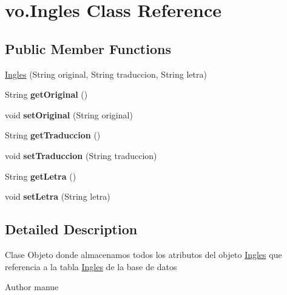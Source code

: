 \hypertarget{classvo_1_1_ingles}{}\section{vo.\+Ingles Class Reference}
\label{classvo_1_1_ingles}
\subsection*{Public Member Functions}
\begin{DoxyCompactItemize}
\item 
\mbox{\hyperlink{classvo_1_1_ingles_a843fd4ed2c71077a7b08723ca778019a}{Ingles}} (String original, String traduccion, String letra)
\item 
\mbox{\label{classvo_1_1_ingles_ac3f680e7f7363688b268a01e4b57d30d}} 
String {\bfseries get\+Original} ()
\item 
\mbox{\label{classvo_1_1_ingles_ae09fa1647ce7100f215f68c43c519d25}} 
void {\bfseries set\+Original} (String original)
\item 
\mbox{\label{classvo_1_1_ingles_a40e108670d3cd06fbf0d80851e0a923e}} 
String {\bfseries get\+Traduccion} ()
\item 
\mbox{\label{classvo_1_1_ingles_a1c6b4890a30b7c2b34d73145d80ce78f}} 
void {\bfseries set\+Traduccion} (String traduccion)
\item 
\mbox{\label{classvo_1_1_ingles_a5fc084959c4509c2f504df4fe3225a87}} 
String {\bfseries get\+Letra} ()
\item 
\mbox{\label{classvo_1_1_ingles_a81c182a3ad62672e1cf3b3e4fcd6f0da}} 
void {\bfseries set\+Letra} (String letra)
\end{DoxyCompactItemize}


\subsection{Detailed Description}
Clase Objeto donde almacenamos todos los atributos del objeto \mbox{\hyperlink{classvo_1_1_ingles}{Ingles}} que referencia a la tabla \mbox{\hyperlink{classvo_1_1_ingles}{Ingles}} de la base de datos \begin{DoxyAuthor}{Author}
manue 
\end{DoxyAuthor}


